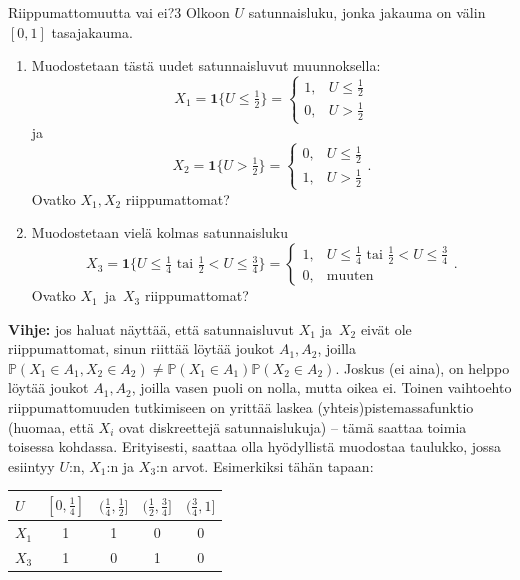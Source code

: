 \documentclass[11pt,a4paper]{amsart}
\newcommand{\1}{\mathbf{1}}
\renewcommand{\P}{\mathbb P}
\begin{document}
\begin{Exercises}{Riippumattomuutta vai ei?}{3}
Olkoon $U$ satunnaisluku, jonka jakauma on välin $[0,1]$ tasajakauma. 
\begin{enumerate}
\item Muodostetaan tästä uudet satunnaisluvut muunnoksella: 
\[
X_1=\mathbf 1\{U\leq \tfrac{1}{2}\}=\begin{cases}
1, & U\leq \frac{1}{2}\\
0, & U>\frac{1}{2}
\end{cases}
\]
ja 
\[
X_2=\mathbf 1\{U> \tfrac{1}{2}\}=\begin{cases}
0, & U\leq \frac{1}{2}\\
1, & U>\frac{1}{2}
\end{cases}.
\]
Ovatko $X_1,X_2$ riippumattomat?

\item 
Muodostetaan vielä kolmas satunnaisluku
\[
X_3=\mathbf 1\{U\leq \tfrac{1}{4} \text{ tai } \tfrac{1}{2}<U\leq \tfrac{3}{4}\}=\begin{cases}
1, & U\leq \tfrac{1}{4} \text{ tai } \tfrac{1}{2}<U\leq \tfrac{3}{4}\\
0, & \text{muuten}
\end{cases}.
\]
Ovatko $X_1$ ja $X_3$ riippumattomat?

\end{enumerate}
{\bf Vihje:} jos haluat näyttää, että satunnaisluvut $X_1$ ja $X_2$ eivät ole riippumattomat, sinun riittää löytää joukot $A_1,A_2$, joilla $\P(X_1\in A_1,X_2\in A_2)\neq \P(X_1\in A_1)\P(X_2\in A_2)$. Joskus (ei aina), on helppo löytää joukot $A_1,A_2$, joilla vasen puoli on nolla, mutta oikea ei. Toinen vaihtoehto riippumattomuuden tutkimiseen on yrittää laskea (yhteis)pistemassafunktio (huomaa, että $X_i$ ovat diskreettejä satunnaislukuja) -- tämä saattaa toimia toisessa kohdassa. Erityisesti, saattaa olla hyödyllistä muodostaa taulukko, jossa esiintyy $U$:n, $X_1$:n ja $X_3$:n arvot. Esimerkiksi tähän tapaan:
\begin{center}
  \begin{tabular}{ | l | c | c | c | c |}
    \hline
    $U$ & $[0,\frac{1}{4}]$ & $(\frac{1}{4},\frac{1}{2}]$ & $(\frac{1}{2}, \frac{3}{4}]$ & $(\frac{3}{4},1]$ \\ \hline
    $X_1$ & 1 & 1 & 0 & 0 \\ \hline
    $X_3$ & 1 & 0 & 1 & 0 \\
    \hline
  \end{tabular}
\end{center}

\end{Exercises}
\end{document}
